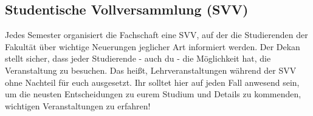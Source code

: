 \subsection{Studentische Vollversammlung (SVV)}
Jedes Semester organisiert die Fachschaft eine SVV, auf der die 
Studierenden der Fakultät über wichtige Neuerungen jeglicher Art 
informiert werden. Der Dekan stellt sicher, dass jeder Studierende - 
auch du - die Möglichkeit hat, die Veranstaltung zu besuchen. Das heißt, 
Lehrveranstaltungen während der SVV ohne Nachteil für euch 
ausgesetzt.\doublebreak
Ihr solltet hier auf jeden Fall anwesend sein, um die neusten Entscheidungen zu eurem Studium und Details zu
kommenden, wichtigen Veranstaltungen zu erfahren!